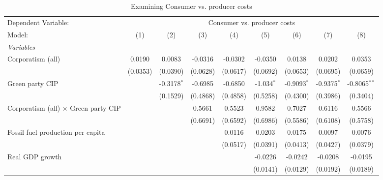 
\begin{table}[htbp]
   \caption{Examining Consumer vs. producer costs}
   \centering
   \begin{tabular}{lcccccccc}
      \tabularnewline \midrule \midrule
      Dependent Variable: & \multicolumn{8}{c}{Consumer vs. producer costs}\\
      Model:                                      & (1)      & (2)           & (3)      & (4)      & (5)          & (6)           & (7)           & (8)\\  
      \midrule
      \emph{Variables}\\
      Corporatism (all)                           & 0.0190   & 0.0083        & -0.0316  & -0.0302  & -0.0350      & 0.0138        & 0.0202        & 0.0353\\   
                                                  & (0.0353) & (0.0390)      & (0.0628) & (0.0617) & (0.0692)     & (0.0653)      & (0.0695)      & (0.0659)\\   
      Green party CIP                             &          & -0.3178$^{*}$ & -0.6985  & -0.6850  & -1.034$^{*}$ & -0.9093$^{*}$ & -0.9375$^{*}$ & -0.8065$^{**}$\\   
                                                  &          & (0.1529)      & (0.4868) & (0.4858) & (0.5258)     & (0.4300)      & (0.3986)      & (0.3404)\\   
      Corporatism (all) $\times$ Green party CIP  &          &               & 0.5661   & 0.5523   & 0.9582       & 0.7027        & 0.6116        & 0.5566\\   
                                                  &          &               & (0.6691) & (0.6592) & (0.6986)     & (0.5586)      & (0.6108)      & (0.5758)\\   
      Fossil fuel production per capita           &          &               &          & 0.0116   & 0.0203       & 0.0175        & 0.0097        & 0.0076\\   
                                                  &          &               &          & (0.0517) & (0.0391)     & (0.0413)      & (0.0427)      & (0.0379)\\   
      Real GDP growth                             &          &               &          &          & -0.0226      & -0.0242       & -0.0208       & -0.0195\\   
                                                  &          &               &          &          & (0.0141)     & (0.0129)      & (0.0192)      & (0.0189)\\   

\end{tabular}
\end{table}
